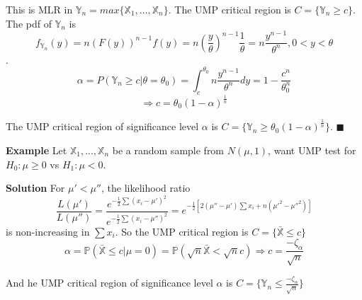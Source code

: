This is MLR in $\mathbb{Y}_n = max\{\mathbb{X}_1, ..., \mathbb{X}_n\}$. The UMP critical region is $C = \{ \mathbb{Y}_n \geq c \}$. The pdf of $\mathbb{Y}_n$ is
$$f_{\mathbb{Y}_n}(y) = n(F(y))^{n-1}f(y) = n(\frac{y}{\theta})^{n-1}\frac{1}{\theta} = n\frac{y^{n-1}}{\theta^n}, 0 < y < \theta$$.
$$\alpha = P(\mathbb{Y}_n \geq c | \theta = \theta_0) = \int_c^{\theta_0} n\frac{y^{n-1}}{\theta^n} dy = 1 - \frac{c^n}{\theta_0^n}$$
$$\Rightarrow c = \theta_0(1-\alpha)^{\frac{1}{n}}$$

The UMP critical region of significance level $\alpha$ is $C = \{ \mathbb{Y}_n \geq  \theta_0(1-\alpha)^{\frac{1}{n}} \}$. $\blacksquare$

\textbf{Example} Let  $\mathbb{X}_1, ..., \mathbb{X}_n$ be a random sample from $N(\mu, 1)$, want  UMP test for $H_0: \mu \geq 0$ vs $H_1: \mu< 0$.

\textbf{Solution} For $\mu' < \mu''$, the likelihood ratio
$$\frac{L(\mu')}{L(\mu'')} = \frac{e^{-\frac{1}{2}\sum (x_i - \mu')^2}}{e^{-\frac{1}{2}\sum (x_i - \mu'')^2}}
= e^{-\frac{1}{2}[2(\mu''-\mu')\sum x_i + n (\mu'^2 - \mu''^2)]}$$
is non-increasing in $\sum x_i$. So the UMP critical region is $C = \{ \bar{\mathbb{X}} \leq c\}$
$$\alpha = \mathbb{P}( \bar{\mathbb{X}} \leq c | \mu = 0)  = \mathbb{P}(\sqrt{n}  \bar{\mathbb{X}} < \sqrt{n}c)
\Rightarrow c = \frac{-\zeta_\alpha}{\sqrt{n}}$$

And he UMP critical region of significance level $\alpha$ is $C = \{ \mathbb{Y}_n \leq  \frac{-\zeta_\alpha}{\sqrt{n}} \}$